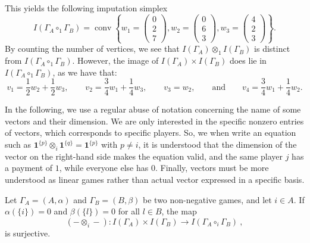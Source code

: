 \documentclass[a4paper,12pt]{amsart}
\begin{document}
\begin{example}
    This yields the following imputation simplex
    \[
    I(\Gamma_A \circ_1 \Gamma_B) = \operatorname{conv} \left\{ w_1 = \begin{pmatrix} 0 \\ 2 \\ 7 \end{pmatrix}, w_2 = \begin{pmatrix} 0 \\ 6 \\ 3 \end{pmatrix}, w_3 = \begin{pmatrix} 4 \\ 2 \\ 3 \end{pmatrix} \right\}. 
    \]
    By counting the number of vertices, we see that \(I(\Gamma_A) \otimes_1 I(\Gamma_B)\) is distinct from \(I(\Gamma_A \circ_1 \Gamma_B)\). However, the image of $I(\Gamma_A) \times I(\Gamma_B)$ does lie in \(I(\Gamma_A \circ_1 \Gamma_B)\), as we have that: 
    \[
    v_1 = \frac{1}{2} w_2 + \frac{1}{2} w_3, \qquad v_2 = \frac{3}{4} w_1 + \frac{1}{4} w_3, \qquad v_3 = w_2, \qquad \text{and} \qquad v_4 = \frac{3}{4} w_1 + \frac{1}{4} w_2. 
    \]
\end{example}

\begin{remark}
    In the following, we use a regular abuse of notation concerning the name of some vectors and their dimension. We are only interested in the specific nonzero entries of vectors, which corresponds to specific players. So, we when write an equation such as \(\mathbf{1}^{\{p\}} \otimes_i \mathbf{1}^{\{q\}} = \mathbf{1}^{\{p\}}\) with \(p \neq i\), it is understood that the dimension of the vector on the right-hand side makes the equation valid, and the same player \(j\) has a payment of \(1\), while everyone else has \(0\). Finally, vectors must be more understood as linear games rather than actual vector expressed in a specific basis. 
\end{remark}

\begin{proposition}\label{prop: tensor of imputations is surjective}
Let \(\Gamma_A = (A, \alpha)\) and \(\Gamma_B =(B, \beta)\) be two non-negative games, and let \(i \in A\). If $\alpha(\{i\}) = 0$ and \(\beta(\{l\}) = 0\) for all \(l \in B\), the map
\[
(- \otimes_i -): I(\Gamma_A) \times I(\Gamma_B) \longrightarrow I(\Gamma_A \circ_i \Gamma_B)~, 
\]
is surjective. 
\end{proposition}
\end{document}
